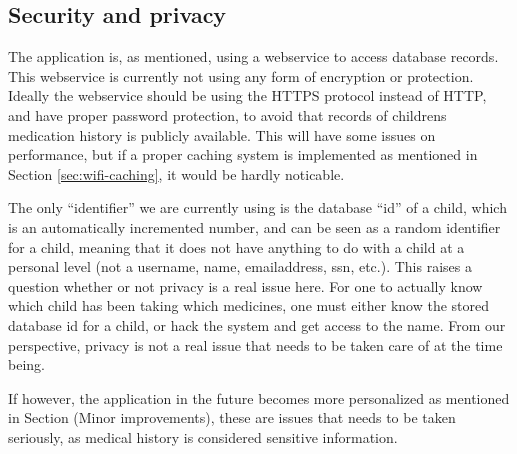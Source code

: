 
\subsection{Security and privacy}
\label{sec:sec-and-privacy}
The application is, as mentioned, using a webservice to access database records. This webservice is currently not using any form of encryption or protection.
Ideally the webservice should be using the HTTPS protocol instead of HTTP, and have proper password protection, to avoid that records of childrens medication history is publicly
available. This will have some issues on performance, but if a proper caching system is implemented as mentioned in Section \ref{sec:wifi-caching}, it would be hardly noticable.


The only ``identifier'' we are currently using is the database ``id'' of a child, which is an automatically incremented number, and can be seen as a random identifier for a child, meaning that it does
not have anything to do with a child at a personal level (not a username, name, emailaddress, ssn, etc.). This raises a question whether or not privacy is a real issue here. 
For one to actually know which child has been taking which medicines, one must either know the stored database id for a child, or hack the system and get access to the name. 
From our perspective, privacy is not a real issue that needs to be taken care of at the time being. 


If however, the application in the future becomes more personalized as mentioned in Section (Minor improvements), these are issues that needs to be taken seriously, as medical history is considered sensitive information. 